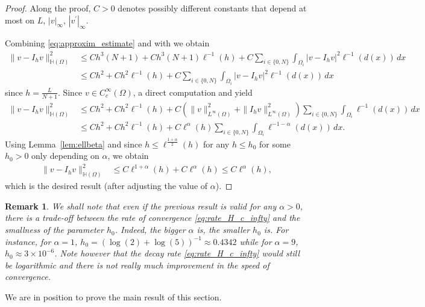 \documentclass[10 pt]{article}
\newtheorem{remark}[theorem]{Remark}
\numberwithin{equation}{section}
\newcommand{\B}[1]{{\color{red} #1}}  %
\begin{document}
\begin{proof}
Along the proof, $C>0$ denotes possibly different constants that depend at most on $L$, $|v|_{\infty}$, $|v^\prime|_{\infty}$.

Combining \eqref{eq:approxim_estimate} and  with  we obtain
%
\begin{align*}
    \|v-I_h v\|^2_{\mathbb H(\Omega)}&\leq  C h^3(N+1)+Ch^3(N+1)\ell^{-1}(h)+C\sum_{i\in\{0,N\}}\int_{\Omega_i}|v-I_h v|^2\ell^{-1}(d(x))\,dx \\
    &\leq Ch^2+Ch^2\ell^{-1}(h)+C\sum_{i\in\{0,N\}}\int_{\Omega_i}|v-I_h v|^2\ell^{-1}(d(x))\,dx
\end{align*}
since $h=\frac{L}{N+1}$. Since $v\in C_c^\infty(\Omega)$, a direct computation and  yield
%
\begin{align*}
    \|v-I_h v\|^2_{\mathbb H(\Omega)} &\leq Ch^2+Ch^2\ell^{-1}(h)+C\left(\|v\|_{L^\infty(\Omega)}^2+\|I_hv\|^2_{L^\infty(\Omega)}\right)\sum_{i\in\{0,N\}}\int_{\Omega_i}\ell^{-1}(d(x))\,dx \\
    & \leq Ch^2+Ch^2\ell^{-1}(h)+C\ell^{\alpha}(h)\sum_{i\in\{0,N\}}\int_{\Omega_i}\ell^{-1-\alpha}(d(x))\,dx.
\end{align*}
%
Using Lemma~\ref{lem:ellbeta} and since $h\leq \ell^{\frac{1+\alpha}{2}}(h)$ for any $h\leq h_0$ for some $h_0>0$ only depending on $\alpha$, we obtain
%
\begin{align*}
    \|v-I_h v\|^2_{\mathbb H(\Omega)}
    & \leq C\ell^{1+\alpha}(h)+C\ell^{\alpha}(h)\leq C \ell^{\alpha}(h),
\end{align*}
which is the desired result \B{(after adjusting the value of $\alpha$)}.
\end{proof}

\begin{remark}
We shall note that even if the previous result is valid for any $\alpha>0$, there is a trade-off between the rate of convergence \eqref{eq:rate_H_c_infty} and the smallness of the parameter $h_0$. Indeed, the bigger $\alpha$ is, the smaller $h_0$ is. For instance, for $\alpha=1$, $h_0=(\log(2)+\log(5))^{-1}\approx 0.4342$ while for $\alpha=9$, $h_0\approx 3\times 10^{-6}$. Note however that the decay rate \eqref{eq:rate_H_c_infty} would still be logarithmic and there is not really much improvement in the speed of convergence.  
\end{remark}

We are in position to prove the main result of this section.
\end{document}
